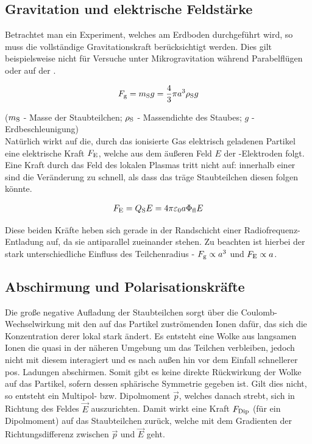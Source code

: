     \subsection{Gravitation und elektrische Feldstärke}\label{subsub:grav}

    Betrachtet man ein Experiment, welches am Erdboden durchgeführt wird, so muss die vollständige Gravitationskraft berücksichtigt werden. Dies gilt beispielsweise nicht für Versuche unter Mikrogravitation während Parabelflügen oder auf der .

      \begin{align}
        F_\text{g}=m_\text{S} g=\frac{4}{3}\pi a^3 \rho_\text{S} g
      \end{align}

    ($m_\text{S}$ - Masse der Staubteilchen; $\rho_\text{S}$ - Massendichte des Staubes; $g$ - Erdbeschleunigung)\\
    Natürlich wirkt auf die, durch das ionisierte Gas elektrisch geladenen Partikel eine elektrische Kraft $F_\text{E}$, welche aus dem äußeren Feld $E$ der -Elektroden folgt. Eine Kraft durch das Feld des lokalen Plasmas tritt nicht auf: innerhalb einer  sind die Veränderung zu schnell, als dass das träge Staubteilchen diesen folgen könnte. 

      \begin{align}
      F_\text{E}=Q_\text{S} E=4 \pi \varepsilon_\text{0} a \Phi_\text{fl} E
      \end{align}

    Diese beiden Kräfte heben sich gerade in der Randschicht einer Radiofrequenz-Entladung auf, da sie antiparallel zueinander stehen. Zu beachten ist hierbei der stark unterschiedliche Einfluss des Teilchenradius - $F_\text{g}\propto a^3$ und $F_\text{E}\propto a$.\\

    \subsection{Abschirmung und Polarisationskräfte}\label{subsub:abschirm}

    Die große negative Aufladung der Staubteilchen sorgt über die Coulomb-Wechselwirkung mit den auf das Partikel zuströmenden Ionen dafür, das sich die Konzentration derer lokal stark ändert. Es entsteht eine Wolke aus langsamen Ionen die quasi in der näheren Umgebung um das Teilchen verbleiben, jedoch nicht mit diesem interagiert und es nach außen hin vor dem Einfall schnellerer pos. Ladungen abschirmen. Somit gibt es keine direkte Rückwirkung der Wolke auf das Partikel, sofern dessen sphärische Symmetrie gegeben ist. Gilt dies nicht, so entsteht ein Multipol- bzw. Dipolmoment $\vec{p}$, welches danach strebt, sich in Richtung des Feldes $\vec{E}$ auszurichten. Damit wirkt eine Kraft $F_\text{Dip}$ (für ein Dipolmoment) auf das Staubteilchen zurück, welche mit dem Gradienten der Richtungsdifferenz zwischen $\vec{p}$ und $\vec{E}$ geht.

